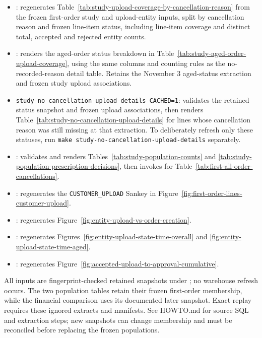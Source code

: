 \begin{itemize}[leftmargin=*]
\item {}: regenerates
Table~\ref{tab:study-upload-coverage-by-cancellation-reason} from the frozen
first-order study and upload-entity inputs, split by cancellation reason and
frozen line-item status, including line-item coverage and
distinct total, accepted and rejected entity counts.
\item {}: renders the aged-order status
breakdown in Table~\ref{tab:study-aged-order-upload-coverage}, using the same
columns and counting rules as the no-recorded-reason detail table. Retains the
November 3 aged-status extraction and frozen study upload associations.
\item \texttt{study-no-cancellation-upload-details CACHED=1}: validates the retained
status snapshot and frozen upload associations, then renders
Table~\ref{tab:study-no-cancellation-upload-details} for lines whose cancellation
reason was still missing at that extraction. To deliberately refresh only these
statuses, run \texttt{make study-no-cancellation-upload-details} separately.
\item {}: validates and renders
Tables~\ref{tab:study-population-counts} and
\ref{tab:study-population-prescription-decisions}, then invokes
 for
Table~\ref{tab:first-all-order-cancellations}.
\item {}: regenerates the
\texttt{CUSTOMER\_UPLOAD} Sankey in Figure~\ref{fig:first-order-lines-customer-upload}.
\item {}: regenerates
Figure~\ref{fig:entity-upload-vs-order-creation}.
\item {}: regenerates
Figures~\ref{fig:entity-upload-state-time-overall} and
\ref{fig:entity-upload-state-time-aged}.
\item {}: regenerates
Figure~\ref{fig:accepted-upload-to-approval-cumulative}.
\end{itemize}
All inputs are fingerprint-checked retained snapshots under ; no
warehouse refresh occurs. The two population tables retain their frozen
first-order membership, while the financial comparison uses its documented
later snapshot. Exact replay requires these ignored extracts and manifests.
See HOWTO.md for source SQL and extraction steps; new snapshots can change
membership and must be reconciled before replacing the frozen populations.
